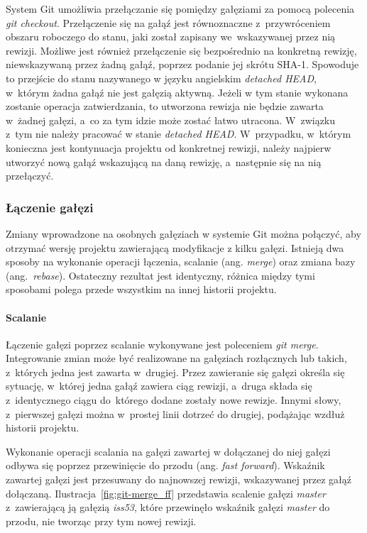 \documentclass[12pt,a4paper,polish,thesis]{dcsbook}
\begin{document}
	System Git umożliwia przełączanie się pomiędzy gałęziami za pomocą polecenia \textit{git checkout}. Przełączenie się na gałąź jest równoznaczne z~przywróceniem obszaru roboczego do stanu, jaki został zapisany we~wskazywanej przez nią rewizji. Możliwe jest również przełączenie się bezpośrednio na konkretną rewizję, niewskazywaną przez żadną gałąź, poprzez podanie jej skrótu SHA-1. Spowoduje to przejście do stanu nazywanego w języku angielskim \textit{detached HEAD}, w~którym żadna gałąź nie jest gałęzią aktywną. Jeżeli w tym stanie wykonana zostanie operacja zatwierdzania, to utworzona rewizja nie będzie zawarta w~żadnej gałęzi, a~co za tym idzie może zostać łatwo utracona. W~związku z~tym nie należy pracować w stanie \textit{detached HEAD}. W~przypadku, w~którym konieczna jest kontynuacja projektu od konkretnej rewizji, należy najpierw utworzyć nową gałąź wskazującą na daną rewizję, a~następnie się na nią przełączyć.

	\subsubsection*{Łączenie gałęzi}
	Zmiany wprowadzone na osobnych gałęziach w systemie Git można połączyć, aby otrzymać wersję projektu zawierającą modyfikacje z kilku gałęzi. Istnieją dwa sposoby na wykonanie operacji łączenia, scalanie (ang. \textit{merge}) oraz zmiana bazy (ang.~\textit{rebase}). Ostateczny rezultat jest identyczny, różnica między tymi sposobami polega przede wszystkim na innej historii projektu.

	\paragraph{Scalanie}

	Łączenie gałęzi poprzez scalanie wykonywane jest poleceniem \textit{git merge}. Integrowanie zmian może być realizowane na gałęziach rozłącznych lub takich, z~których jedna jest zawarta w~drugiej. Przez zawieranie się gałęzi określa się sytuację, w~której jedna gałąź zawiera ciąg rewizji, a~druga składa się z~identycznego ciągu do~którego dodane zostały nowe rewizje. Innymi słowy, z~pierwszej gałęzi można w~prostej linii dotrzeć do drugiej, podążając wzdłuż historii projektu.

	Wykonanie operacji scalania na gałęzi zawartej w dołączanej do niej gałęzi odbywa się poprzez przewinięcie do przodu (ang. \textit{fast forward}). Wskaźnik zawartej gałęzi jest przesuwany do najnowszej rewizji, wskazywanej przez gałąź dołączaną. Ilustracja~\ref{fig:git-merge_ff} przedstawia scalenie gałęzi \textit{master} z~zawierającą ją gałęzią \textit{iss53}, które przewinęło wskaźnik gałęzi \textit{master} do przodu, nie tworząc przy tym nowej rewizji.
\end{document}

